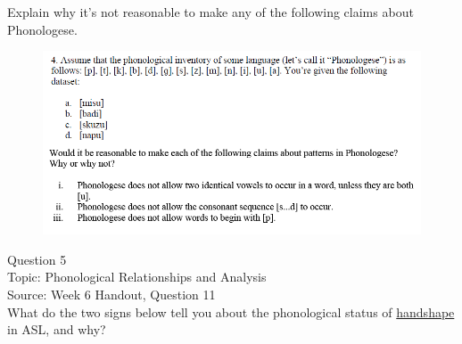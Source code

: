\documentclass[12pt]{article}
\begin{document}
Explain why it's not reasonable to make any of the following claims about Phonologese.\\

\begin{figure}[H]
\includegraphics{../images/Phonologese.png}
\end{figure}

\newpage

{\large Question 5}\\

Topic: Phonological Relationships and Analysis\\
Source: Week 6 Handout, Question 11\\

What do the two signs below tell you about the phonological status of \underline{handshape} in ASL, and why?\\
\end{document}
